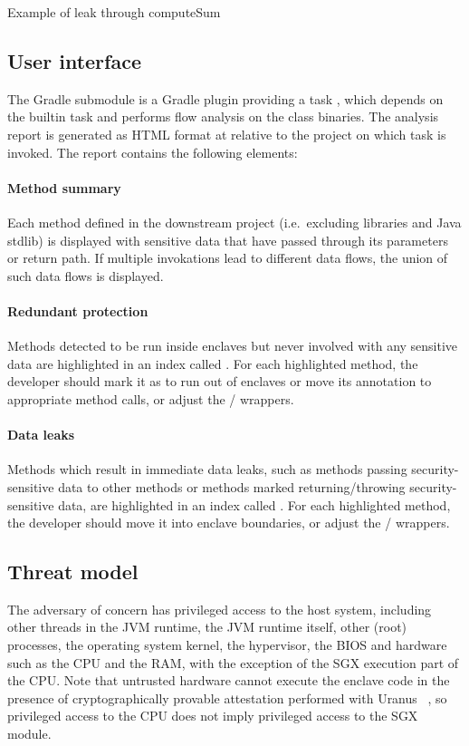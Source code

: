 {Example of leak through computeSum}

\subsection{User interface}\label{subsec:user-interface}
The  Gradle submodule
is a Gradle plugin providing a task ,
which depends on the  builtin task
and performs flow analysis on the class binaries.
The analysis report is generated as HTML format at
relative to the project on which task is invoked.
The report contains the following elements:

\paragraph{Method summary}
Each method defined in the downstream project (i.e.\ excluding libraries and Java stdlib)
is displayed with sensitive data that have passed through its parameters or return path.
If multiple invokations lead to different data flows,
the union of such data flows is displayed.

\paragraph{Redundant protection}
Methods detected to be run inside enclaves but never involved with any sensitive data
are highlighted in an index called .
For each highlighted method, the developer
should mark it as  to run out of enclaves
or move its  annotation to appropriate method calls,
or adjust the / wrappers.

\paragraph{Data leaks}
Methods which result in immediate data leaks,
such as methods passing security-sensitive data to other  methods
or methods marked  returning/throwing security-sensitive data,
are highlighted in an index called .
For each highlighted method, the developer
should move it into enclave boundaries,
or adjust the / wrappers.

\subsection{Threat model}\label{subsec:threat-model}
The adversary of concern has privileged access to the host system,
including other threads in the JVM runtime, the JVM runtime itself,
other (root) processes, the operating system kernel,
the hypervisor, the BIOS and hardware such as the CPU and the RAM,
with the exception of the SGX execution part of the CPU\@.
Note that untrusted hardware cannot execute the enclave code
in the presence of cryptographically provable attestation performed with Uranus ~\cite{uranus},
so privileged access to the CPU does not imply privileged access to the SGX module.

